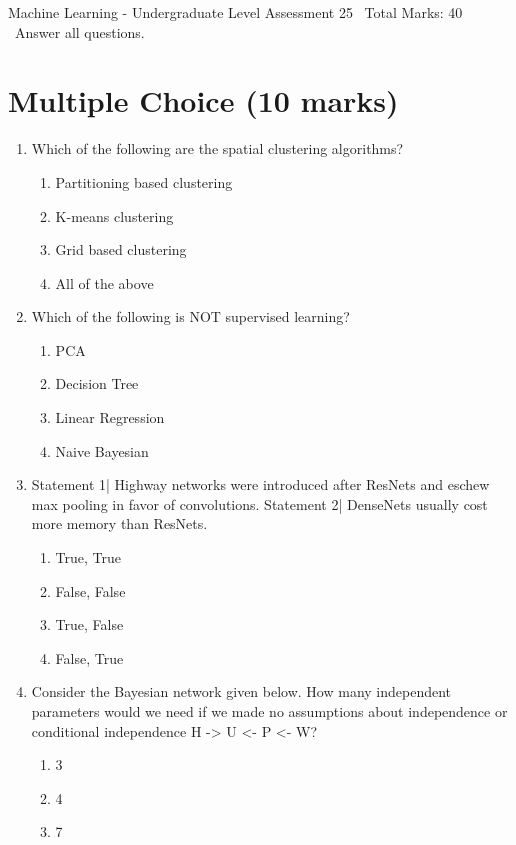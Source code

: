 \documentclass[12pt]{article}
\begin{document}
\begin{center}
Machine Learning - Undergraduate Level Assessment 25 \
Total Marks: 40 \
Answer all questions.
\end{center}

\section*{Multiple Choice (10 marks)}
\begin{enumerate}[label=\arabic*.]
\item Which of the following are the spatial clustering algorithms?
\begin{enumerate}[label=(\alph*)]
    \item Partitioning based clustering
    \item K-means clustering
    \item Grid based clustering
    \item All of the above
\end{enumerate}
\item Which of the following is NOT supervised learning?
\begin{enumerate}[label=(\alph*)]
    \item PCA
    \item Decision Tree
    \item Linear Regression
    \item Naive Bayesian
\end{enumerate}
\item Statement 1| Highway networks were introduced after ResNets and eschew max pooling in favor of convolutions. Statement 2| DenseNets usually cost more memory than ResNets.
\begin{enumerate}[label=(\alph*)]
    \item True, True
    \item False, False
    \item True, False
    \item False, True
\end{enumerate}
\item Consider the Bayesian network given below. How many independent parameters would we need if we made no assumptions about independence or conditional independence H -\textgreater{} U \textless{}- P \textless{}- W?
\begin{enumerate}[label=(\alph*)]
    \item 3
    \item 4
    \item 7

\end{enumerate}
\end{enumerate}
\end{document}
